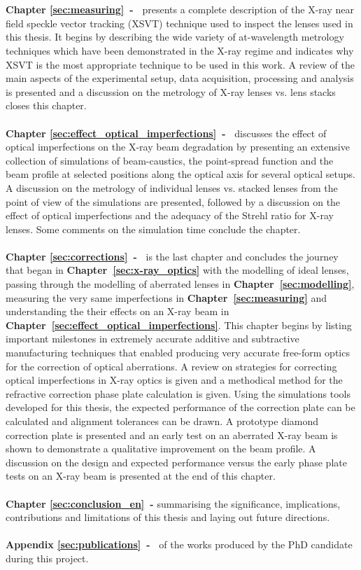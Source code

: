 \\
\\
\textbf{Chapter \ref{sec:measuring}~-~} presents a complete description of the X-ray near field speckle vector tracking (XSVT) technique used to inspect the lenses used in this thesis. It begins by describing the wide variety of at-wavelength metrology techniques which have been demonstrated in the X-ray regime and indicates why XSVT is the most appropriate technique to be used in this work. A review of the main aspects of the experimental setup,  data acquisition, processing and analysis is presented and a discussion on the metrology of X-ray lenses vs. lens stacks closes this chapter.
\\
\\
\textbf{Chapter \ref{sec:effect_optical_imperfections}~-~} discusses the effect of optical imperfections on the X-ray beam degradation by presenting an extensive collection of simulations of beam-caustics, the point-spread function and the beam profile at selected positions along the optical axis for several optical setups. A discussion on the metrology of individual lenses vs. stacked lenses from the point of view of the simulations are presented, followed by a discussion on the effect of optical imperfections and the adequacy of the Strehl ratio for X-ray lenses. Some comments on the simulation time conclude the chapter.
\\
\\
\textbf{Chapter \ref{sec:corrections}~-~} is the last chapter and concludes the journey that began in \textbf{Chapter~\ref{sec:x-ray_optics}} with the modelling of ideal lenses, passing through the modelling of aberrated lenses in \textbf{Chapter~\ref{sec:modelling}}, measuring the very same imperfections in \textbf{Chapter~\ref{sec:measuring}} and understanding the their effects on an X-ray beam in \textbf{Chapter~\ref{sec:effect_optical_imperfections}}. This chapter begins by listing important milestones in extremely accurate additive and subtractive manufacturing techniques that enabled producing very accurate free-form optics for the correction of optical aberrations. A review on strategies for correcting optical imperfections in X-ray optics is given and a methodical method for the refractive correction phase plate calculation is given. Using the simulations tools developed for this thesis, the expected performance of the correction plate can be calculated and alignment tolerances can be drawn. A prototype diamond correction plate is presented and an early test on an aberrated X-ray beam is shown to demonstrate a qualitative improvement on the beam profile. A discussion on the design and expected performance versus the early phase plate tests on an X-ray beam is presented at the end of this chapter.
\\
\\
\textbf{Chapter \ref{sec:conclusion_en}~-} summarising the significance, implications, contributions and limitations of this thesis and laying out future directions.
\\
\\
\textbf{Appendix \ref{sec:publications}~-~} of the works produced by the PhD candidate during this project.